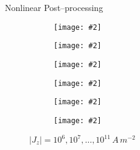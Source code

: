 \documentclass{beamer}
\newcommand{\includegraphicsw}[2][1.]{\texttt{[image: \#2]}}
\begin{document}
	\begin{frame}{Nonlinear Post–processing}
	   	\begin{figure}
	   		\centering
	   		\begin{subfigure}{.42\linewidth}
	   			\centering
	   			\includegraphicsw{a_nonlinear_6.png}
	   		\end{subfigure}%
	   		\hfill
	   		\begin{subfigure}{.42\linewidth}
	   			\centering
	   			\includegraphicsw{a_nonlinear_7.png}
	   		\end{subfigure}%
	   		\par\bigskip
	   		\begin{subfigure}{.42\linewidth}
	   			\centering
	   			\includegraphicsw{a_nonlinear_8.png}
	   		\end{subfigure}%
	   		\hfill
	   		\begin{subfigure}{.42\linewidth}
	   			\centering
	   			\includegraphicsw{a_nonlinear_9.png}
	   		\end{subfigure}%
	   		\par\bigskip
	   		\begin{subfigure}{.42\linewidth}
	   			\centering
	   			\includegraphicsw{a_nonlinear_10.png}
	   		\end{subfigure}%
	   		\hfill
	   		\begin{subfigure}{.42\linewidth}
	   			\centering
	   			\includegraphicsw{a_nonlinear_11.png}
	   		\end{subfigure}
	   		\caption{$|J_z| = 10^6, 10^7, \dots, 10^{11}\,A\,m^{-2}$}
	   	\end{figure}
	\end{frame}
\end{document}
